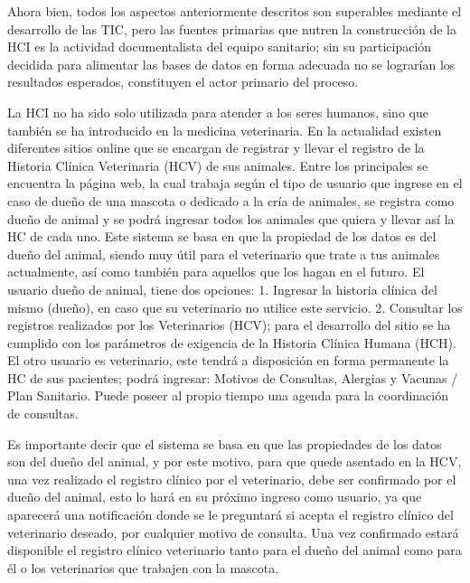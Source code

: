 Ahora bien, todos los aspectos anteriormente descritos son superables mediante el desarrollo de las TIC, pero las fuentes primarias que nutren la construcción de la HCI es la actividad documentalista del equipo sanitario; sin su participación decidida para alimentar las bases de datos en forma adecuada no se lograrían los resultados esperados, constituyen el actor primario del proceso.  

La HCI no ha sido solo utilizada para atender a los seres humanos, sino que también se ha introducido en la medicina veterinaria. En la actualidad existen diferentes sitios online que se encargan de registrar y llevar el registro de la Historia Clínica Veterinaria (HCV) de sus animales. Entre los principales se encuentra la página web, la cual trabaja según el tipo de usuario que ingrese en el caso de dueño de una mascota o dedicado a la cría de animales, se registra como dueño de animal y se podrá ingresar todos los animales que quiera y llevar así la HC de cada uno. Este sistema se basa en que la propiedad de los datos es del dueño del animal, siendo muy útil para el veterinario que trate a tus animales actualmente, así como también para aquellos que los hagan en el futuro. El usuario dueño de animal, tiene dos opciones:  1. Ingresar la historia clínica del mismo (dueño), en caso que su veterinario no utilice este servicio. 2. Consultar los registros realizados por los Veterinarios (HCV); para el desarrollo del sitio se ha cumplido con los parámetros de exigencia de la Historia Clínica Humana (HCH). El otro usuario es veterinario, este tendrá a disposición en forma permanente la HC de sus pacientes; podrá ingresar: Motivos de Consultas, Alergias y Vacunas / Plan Sanitario. Puede poseer al propio tiempo una agenda para la coordinación de consultas.  

Es importante decir que el sistema se basa en que las propiedades de los datos son del dueño del animal, y por este motivo, para que quede asentado en la HCV, una vez realizado el registro clínico por el veterinario, debe ser confirmado por el dueño del animal, esto lo hará en su próximo ingreso como usuario, ya que aparecerá una notificación donde se le preguntará si acepta el registro clínico del veterinario deseado, por cualquier motivo de consulta. Una vez confirmado estará disponible el registro clínico veterinario tanto para el dueño del animal como para él o los veterinarios que trabajen con la mascota.   
\newline
\newline

